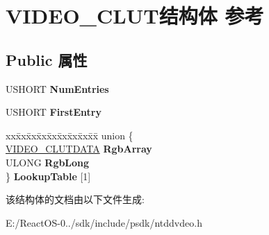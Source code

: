 \hypertarget{struct_v_i_d_e_o___c_l_u_t}{}\section{V\+I\+D\+E\+O\+\_\+\+C\+L\+U\+T结构体 参考}
\label{struct_v_i_d_e_o___c_l_u_t}
\subsection*{Public 属性}
\begin{DoxyCompactItemize}
\item 
\mbox{\label{struct_v_i_d_e_o___c_l_u_t_ad4b53185f2d8dd90ab3ac09fcbcb483c}} 
U\+S\+H\+O\+RT {\bfseries Num\+Entries}
\item 
\mbox{\label{struct_v_i_d_e_o___c_l_u_t_a6a9b37b38741057e891f82dc0f4c4550}} 
U\+S\+H\+O\+RT {\bfseries First\+Entry}
\item 
\mbox{\label{struct_v_i_d_e_o___c_l_u_t_ae13f034710fca6be0fac158f1ef92e23}} 
\begin{tabbing}
xx\=xx\=xx\=xx\=xx\=xx\=xx\=xx\=xx\=\kill
union \{\\
\>\hyperlink{struct___v_i_d_e_o___c_l_u_t_d_a_t_a}{VIDEO\_CLUTDATA} {\bfseries RgbArray}\\
\>ULONG {\bfseries RgbLong}\\
\} {\bfseries LookupTable} \mbox{[}1\mbox{]}\\

\end{tabbing}\end{DoxyCompactItemize}


该结构体的文档由以下文件生成\+:\begin{DoxyCompactItemize}
\item 
E\+:/\+React\+O\+S-\/0../sdk/include/psdk/ntddvdeo.\+h\end{DoxyCompactItemize}
